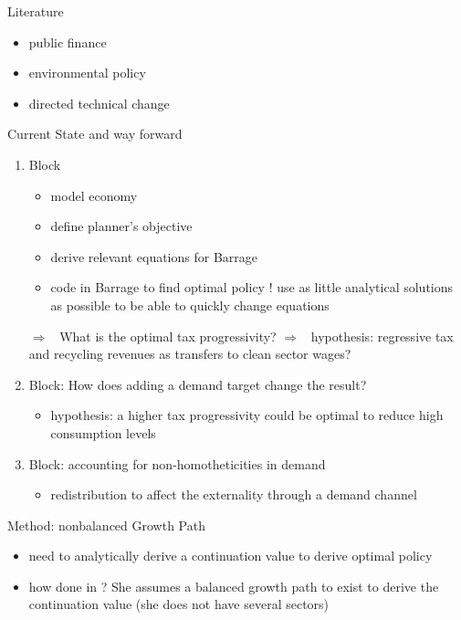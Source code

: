 \documentclass[11pt,aspectratio=169]{beamer}
\newcommand{\ar}{$\Rightarrow$ \ }
\begin{document}
\begin{frame}{Literature}
	\begin{itemize}
		\item public finance
		\item environmental policy
		\item directed technical change
	\end{itemize}
\end{frame}

\begin{frame}{Current State and way forward}
	\begin{enumerate}
		\item Block
		\begin{itemize}
			\item model economy \checkmark
			\item define planner's objective
			\item derive relevant equations for Barrage
			\item code in Barrage to find optimal policy ! use as little analytical solutions as possible to be able to quickly change equations
		\end{itemize}
		\ar What is the optimal tax progressivity? \ar hypothesis: regressive tax and recycling revenues as transfers to clean sector wages?
		\item Block: How does adding a demand target change the result?
		\begin{itemize}
			\item hypothesis: a higher tax progressivity could be optimal to reduce high consumption levels
		\end{itemize}
	\item Block: accounting for non-homotheticities in demand
	\begin{itemize}
		\item redistribution to affect the externality through a demand channel
	\end{itemize}
	\end{enumerate}
\end{frame}

\begin{frame}{Method: nonbalanced Growth Path}
	\begin{itemize}
		\item need to analytically derive a continuation value to derive optimal policy
		\item how done in \cite{Barrage2019OptimalPolicy}? She assumes a balanced growth path to exist to derive the continuation value (she does not have several sectors)
	\end{itemize}
\end{frame}
\end{document}
